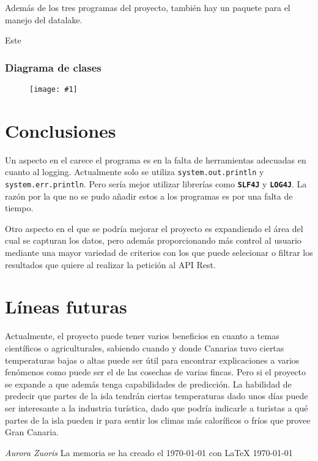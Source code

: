 \documentclass{article}
\newcommand{\cimg}[2]{
\begin{figure}[H]
	\center
		\texttt{[image: \#1]}
\end{figure}
}
\begin{document}
Además de los tres programas del proyecto, también hay un paquete para el manejo del datalake.

Este 

\subsubsection{Diagrama de clases}

\cimg{datalake}{1}

\section{Conclusiones}

Un aspecto en el carece el programa es en la falta de herramientas adecuadas en cuanto al logging.
Actualmente solo se utiliza \texttt{system.out.println} y \texttt{system.err.println}.
Pero sería mejor utilizar librerías como \textbf{\texttt{SLF4J}} y \textbf{\texttt{LOG4J}}.
La razón por la que no se pudo añadir estos a los programas es por una falta de tiempo.

Otro aspecto en el que se podría mejorar el proyecto es expandiendo el área del cual se capturan los datos, pero además proporcionando más control al usuario
mediante una mayor variedad de criterios con los que puede selecionar o filtrar los resultados que quiere al realizar la petición al API Rest.


\section{Líneas futuras}

Actualmente, el proyecto puede tener varios beneficios en cuanto a temas científicos o agriculturales,
sabiendo cuando y donde Canarias tuvo ciertas temperaturas bajas o altas puede ser útil para encontrar explicaciones a varios fenómenos como puede ser el de las cosechas de varias fincas.
Pero si el proyecto se expande a que además tenga capabilidades de predicción. La habilidad de predecir que partes de la isla tendrán ciertas temperaturas dado unos días puede ser interesante
a la industria turística, dado que podría indicarle a turistas a qué partes de la isla pueden ir para sentir los climas más caloríficos o fríos que provee Gran Canaria.

\printbibliography

\begin{titlepage}
	\centering
	{\large\itshape Aurora Zuoris}
	\vfill
	La memoria se ha creado el \today{} con \LaTeX{}
	\vfill
	\today
\end{titlepage}
\end{document}
